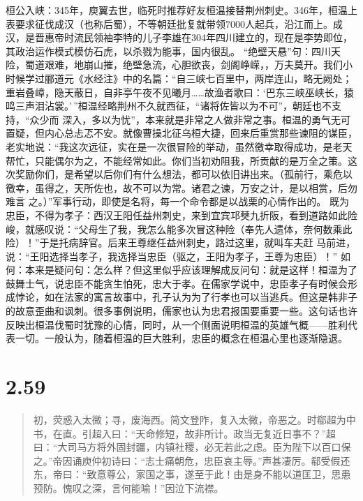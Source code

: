 \documentclass[]{book}
\begin{document}
桓公入峡：345年，庾翼去世，临死时推荐好友桓温接替荆州刺史。346年，桓温上表要求征伐成汉（也称后蜀），不等朝廷批复就带领7000人起兵，沿江而上。成汉，是晋惠帝时流民领袖李特的儿子李雄在304年四川建立的，现在是李势即位，其政治运作模式模仿石虎，以杀戮为能事，国内很乱。
``绝壁天悬''句：四川天险，蜀道艰难，地崩山摧，绝壁急流，心胆欲丧，剑阁峥嵘，，万夫莫开。我们小时候学过郦道元《水经注》中的名篇：``自三峡七百里中，两岸连山，略无阙处；重岩叠嶂，隐天蔽日，自非亭午夜不见曦月\ldots{}\ldots{}故渔者歌曰：`巴东三峡巫峡长，猿鸣三声泪沾裳。'\,''桓温经略荆州不久就西征，``诸将佐皆以为不可''，朝廷也不支持，``众少而
深入，多以为忧''，本来就是非常之人做非常之事。桓温的勇气无可置疑，但内心总忐忑不安。就像曹操北征乌桓大捷，回来后重赏那些谏阻的谋臣，老实地说：``我这次远征，实在是一次很冒险的举动，虽然徼幸取得成功，是老天帮忙，只能偶尔为之，不能经常如此。你们当初劝阻我，所贡献的是万全之策。这次奖励你们，是希望以后你们有什么想法，都可以依旧讲出来。（孤前行，乘危以徼幸，虽得之，天所佐也，故不可以为常。诸君之谏，万安之计，是以相赏，后勿难言
之。）''军事行动，即使是名将，每一个命令都是以战栗的心情作出的。
既为忠臣，不得为孝子：西汉王阳任益州刺史，来到宜宾邛僰九折阪，看到道路如此险峻，就感叹说：``父母生了我，我怎么能多次冒这种险（奉先人遗体，奈何数乘此险）！''于是托病辞官。后来王尊继任益州刺史，路过这里，就叫车夫赶
马前进，说：``王阳选择当孝子，我选择当忠臣（驱之，王阳为孝子，王尊为忠臣）！''
如何：本来是疑问句：怎么样？但这里似乎应该理解成反问句：就是这样！桓温为了鼓舞士气，说忠臣不能贪生怕死，忠大于孝。在儒家学说中，忠臣孝子有时候会形成悖论，如在法家的寓言故事中，孔子认为为了行孝也可以当逃兵。但这是韩非子的故意歪曲和讽刺。很多事例说明，儒家也认为忠君报国要重要一些。这句话也许反映出桓温伐蜀时犹豫的心情，同时，从一个侧面说明桓温的英雄气概------胜利代表一切。一般认为，随着桓温的巨大胜利，忠臣的概念在桓温心里也逐渐隐退。

\section{2.59}\label{section-105}

\begin{quote}
初，荧惑入太微；寻，废海西。简文登阼，复入太微，帝恶之。时郗超为中书，在直。引超入曰：``天命修短，故非所计。政当无复近日事不？''超曰：``大司马方将外固封疆，内镇社稷，必无若此之虑。臣为陛下以百口保之。''帝因诵庾仲初诗曰：``志士痛朝危，忠臣哀主辱。''声甚凄厉。郗受假还东，帝曰：``致意尊公，家国之事，遂至于此！由是身不能以道匡卫，思患预防。愧叹之深，言何能喻！''因泣下流襟。
\end{quote}
\end{document}
